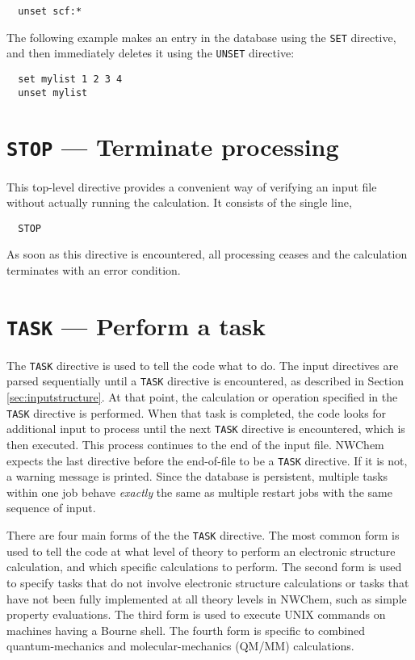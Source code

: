 \begin{verbatim}
  unset scf:*
\end{verbatim}

The following example makes an entry in the database using the
\verb+SET+ directive, and then immediately deletes it using the
\verb+UNSET+ directive:

\begin{verbatim}
  set mylist 1 2 3 4
  unset mylist
\end{verbatim}


\section{{\tt STOP} --- Terminate processing}

This top-level directive provides a convenient way of verifying 
an input file without actually running the calculation.  It consists 
of the single line,

\begin{verbatim}
  STOP
\end{verbatim}

As soon as this directive is encountered, all processing ceases and
the calculation terminates with an error condition.

\section{{\tt TASK} --- Perform a task}
\label{sec:task}

The \verb+TASK+ directive is used to tell the code what to do.  The
input directives are parsed sequentially until a \verb+TASK+ directive
is encountered, as described in Section \ref{sec:inputstructure}.  At
that point, the calculation or operation specified in the \verb+TASK+
directive is performed.  When that task is completed, the code looks
for additional input to process until the next \verb+TASK+ directive
is encountered, which is then executed.  This process continues to the
end of the input file.  NWChem expects the last directive before the
end-of-file to be a \verb+TASK+ directive.  If it is not, a warning
message is printed.  Since the database is persistent, multiple tasks
within one job behave {\em exactly} the same as multiple restart jobs
with the same sequence of input.

There are four main forms of the the \verb+TASK+ directive.  The most
common form is used to tell the code at what level of theory to
perform an electronic structure calculation, and which specific
calculations to perform.  The second form is used to specify tasks
that do not involve electronic structure calculations or tasks that
have not been fully implemented at all theory levels in NWChem, such
as simple property evaluations.  The third form is used to execute
UNIX commands on machines having a Bourne shell.  The fourth form is
specific to combined quantum-mechanics and molecular-mechanics (QM/MM)
calculations.

